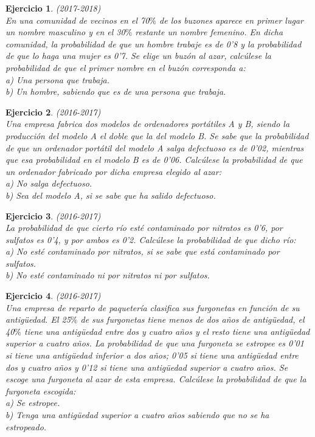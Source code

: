 \documentclass[12pt, a4paper]{amsart}
\newtheorem{ejer}{Ejercicio}
\begin{document}
\begin{ejer}\em (2017-2018)\\
En una comunidad de vecinos en el 70$\%$ de los buzones aparece en primer lugar un nombre masculino y en el
30$\%$ restante un nombre femenino. En dicha comunidad, la probabilidad de que un hombre trabaje es de 0'8 y
la probabilidad de que lo haga una mujer es 0'7. Se elige un buzón al azar, calcúlese la probabilidad de que el
primer nombre en el buzón corresponda a:\\
a) Una persona que trabaja.\\
b) Un hombre, sabiendo que es de una persona que trabaja.
\end{ejer}

\begin{ejer}\em (2016-2017)\\
Una empresa fabrica dos modelos de ordenadores portátiles A y B, siendo la producción del modelo A el doble
que la del modelo B. Se sabe que la probabilidad de que un ordenador portátil del modelo A salga defectuoso
es de 0'02, mientras que esa probabilidad en el modelo B es de 0'06. Calcúlese la probabilidad de que un
ordenador fabricado por dicha empresa elegido al azar:\\
a) No salga defectuoso.\\
b) Sea del modelo A, si se sabe que ha salido defectuoso.
\end{ejer}

\begin{ejer}\em (2016-2017)\\
La probabilidad de que cierto río esté contaminado por nitratos es 0'6, por sulfatos es 0'4, y por ambos es 0'2.
Calcúlese la probabilidad de que dicho río:\\
a) No esté contaminado por nitratos, si se sabe que está contaminado por sulfatos.\\
b) No esté contaminado ni por nitratos ni por sulfatos.
\end{ejer}

\begin{ejer}\em (2016-2017)\\
Una empresa de reparto de paquetería clasifica sus furgonetas en función de su antigüedad. El 25$\%$ de sus
furgonetas tiene menos de dos años de antigüedad, el 40$\%$ tiene una antigüedad entre dos y cuatro años y el
resto tiene una antigüedad superior a cuatro años. La probabilidad de que una furgoneta se estropee es 0'01 si
tiene una antigüedad inferior a dos años; 0'05 si tiene una antigüedad entre dos y cuatro años y 0'12 si tiene una
antigüedad superior a cuatro años. Se escoge una furgoneta al azar de esta empresa. Calcúlese la probabilidad
de que la furgoneta escogida:\\
a) Se estropee.\\
b) Tenga una antigüedad superior a cuatro años sabiendo que no se ha estropeado.
\end{ejer}
\end{document}
